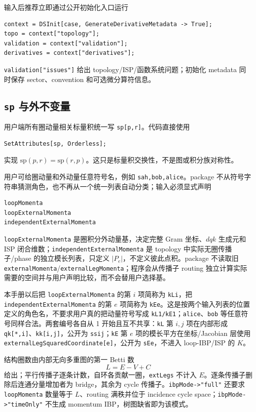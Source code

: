 ﻿\documentclass[a4paper,11pt]{article}
\begin{document}
输入后推荐立即通过公开初始化入口运行
\begin{verbatim}
context = DSInit[case, GenerateDerivativeMetadata -> True];
topo = context["topology"];
validation = context["validation"];
derivatives = context["derivatives"];
\end{verbatim}
\texttt{validation["issues"]} 给出 topology/ISP/函数系统问题；初始化 metadata 同时保存 sector、convention 和可选微分算符信息。

\subsection{\texttt{sp} 与外不变量}

用户端所有圈动量相关标量积统一写 \texttt{sp[p,r]}。代码直接使用
\begin{verbatim}
SetAttributes[sp, Orderless];
\end{verbatim}
实现 $\mathrm{sp}(p,r)=\mathrm{sp}(r,p)$。这只是标量积交换性，不是图或积分族对称性。

用户可给圈动量和外动量任意符号名，例如 \texttt{sah,bob,alice}。package 不从符号字符串猜测角色，也不再从一个统一列表自动分类；输入必须显式声明
\begin{verbatim}
loopMomenta
loopExternalMomenta
independentExternalMomenta
\end{verbatim}
\texttt{loopExternal\allowbreak Momenta} 是圈积分外动量基，决定完整 Gram 坐标、$dqk$ 生成元和 ISP 闭合维数；\texttt{independentExternal\allowbreak Momenta} 是 topology 中实际无圈传播子/phase 的独立模长列表，只定义 $|P_e|$，不定义彼此点积。package 不读取旧 \texttt{externalMomenta}/\texttt{externalLegMomenta}；程序会从传播子 routing 独立计算实际需要的空间并与用户声明比较，而不会替用户选择基。

本手册以后把 \texttt{loopExternalMomenta} 的第 $i$ 项简称为 \texttt{kLi}，把 \texttt{independentExternalMomenta} 的第 $e$ 项简称为 \texttt{kEe}。这是按两个输入列表的位置定义的角色名，不要求用户真的把动量符号写成 \texttt{kL1/kE1}；\texttt{alice}、\texttt{bob} 等任意符号同样合法。两套编号各自从 1 开始且互不共享：\texttt{kL} 第 $i,j$ 项在内部形成 \texttt{qk[*,i]}、\texttt{kk[i,j]}，公开为 \texttt{ssij}；\texttt{kE} 第 $e$ 项的模长平方在坐标/Jacobian 层使用 \texttt{externalLegSquaredCoordinate[e]}，公开为 \texttt{sEe}，不进入 loop-IBP/ISP 的 $K$。

结构圈数由内部无向多重图的第一 Betti 数
\begin{equation}
 L=E-V+C
\end{equation}
给出；平行传播子逐条计数，自环各贡献一圈，\texttt{extLegs} 不计入 $E$。逐条传播子删除后连通分量增加者为 bridge，其余为 cycle 传播子。\texttt{ibpMode->"full"} 还要求 \texttt{loopMomenta} 数量等于 $L$、routing 满秩并位于 incidence cycle space；\texttt{ibpMode->"timeOnly"} 不生成 momentum IBP，树图缺省即为该模式。
\end{document}
